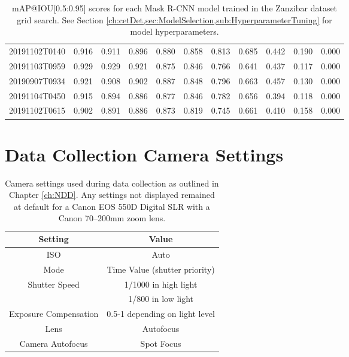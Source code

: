\begin{table}[!ht]
{\begin{tabular}{ccccccccccc}
			20191102T0140 &          0.916 &          0.911 &          0.896 &          0.880 &          0.858 &          0.813 &          0.685 &          0.442 &          0.190 &          0.000 \\
			20191103T0959 &          0.929 &          0.929 &          0.921 &          0.875 &          0.846 &          0.766 &          0.641 &          0.437 &          0.117 &          0.000 \\
			20190907T0934 &          0.921 &          0.908 &          0.902 &          0.887 &          0.848 &          0.796 &          0.663 &          0.457 &          0.130 &          0.000 \\
			20191104T0450 &          0.915 &          0.894 &          0.886 &          0.877 &          0.846 &          0.782 &          0.656 &          0.394 &          0.118 &          0.000 \\
			20191102T0615 &          0.902 &          0.891 &          0.886 &          0.873 &          0.819 &          0.745 &          0.661 &          0.410 &          0.158 &          0.000 \\
			\bottomrule
		\end{tabular}}
	\caption[mAP@IOU{[0.5:0.95]} scores for each Mask R-CNN model trained in the Zanzibar dataset grid search.]{mAP@IOU[0.5:0.95] scores for each Mask R-CNN model trained in the Zanzibar dataset grid search. See Section \ref{ch:cetDet,sec:ModelSelection,sub:HyperparameterTuning} for model hyperparameters.}
\end{table}

\newpage
\section{Data Collection Camera Settings}\label{app:DataCollectionCameraSettings}

\begin{table}[!ht]
	\centering
	\begin{tabular}{cc}\toprule
		\textbf{Setting}               & \textbf{Value}                 \\\midrule
		ISO                            & Auto                           \\
		Mode                           & Time Value (shutter priority)  \\
		\multirow{2}{*}{Shutter Speed} & 1/1000 in high light           \\
		& 1/800 in low light             \\
		Exposure Compensation          & 0.5-1 depending on light level \\
		Lens                          & Autofocus                      \\
		Camera Autofocus               & Spot Focus               \\\bottomrule     
	\end{tabular}
	\caption[Camera settings used during data collection as outlined in Chapter \ref{ch:NDD}.]{Camera settings used during data collection as outlined in Chapter \ref{ch:NDD}. Any settings not displayed remained at default for a Canon EOS 550D Digital SLR with a Canon 70–200mm zoom lens.}
\end{table}


